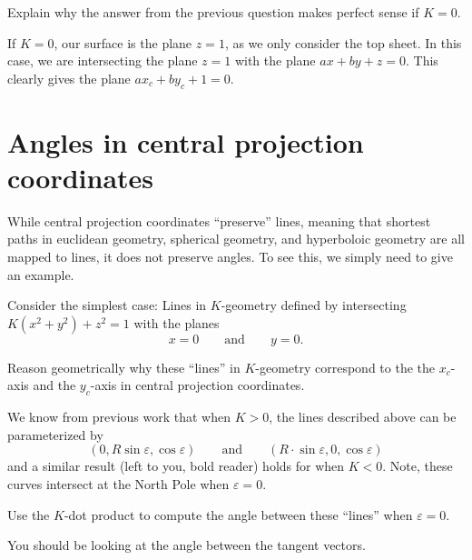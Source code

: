 \documentclass{ximera}
\begin{document}
\begin{problem}
  Explain why the answer from the previous question makes perfect sense if $K=0$.
  \begin{freeResponse}
    If $K=0$, our surface is the plane $z=1$, as we only consider the
    top sheet. In this case, we are intersecting the plane $z=1$ with
    the plane $ax+by+z=0$. This clearly gives the plane $ax_c+ by_c +
    1 = 0.$
  \end{freeResponse}
\end{problem}



\section{Angles in central projection coordinates}

While central projection coordinates ``preserve'' lines, meaning that
shortest paths in euclidean geometry, spherical geometry, and
hyperboloic geometry are all mapped to lines, it does not preserve
angles. To see this, we simply need to give an example.


Consider the simplest case: Lines in $K$-geometry defined by
intersecting $K\left(x^2+y^2\right) + z^2 = 1$ with the planes
\[
x=0 \qquad\text{and}\qquad y=0.
\]

\begin{problem}
  Reason geometrically why these ``lines'' in $K$-geometry correspond
  to the the $x_c$-axis and the $y_c$-axis in central projection
  coordinates.
\end{problem}

We know from previous work that when $K>0$, the lines described above
can be parameterized by
\[
(0, R\sin\varepsilon,\cos\varepsilon)\qquad\text{and}\qquad(R\cdot \sin\varepsilon, 0, \cos\varepsilon)
\]
and a similar result (left to you, bold reader) holds for when
$K<0$. Note, these curves intersect at the North Pole when
$\varepsilon =0$.

\begin{problem}
  Use the $K$-dot product to compute the angle between these ``lines'' when $\varepsilon=0$.
  \begin{hint}
    You should be looking at the angle between the tangent vectors.
  \end{hint}
\end{problem}
\end{document}
